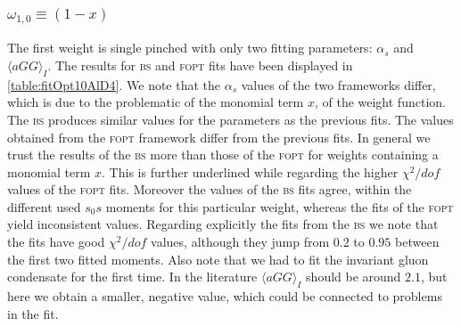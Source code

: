 \documentclass[../../index.tex]{subfiles}
\begin{document}
\subsubsection{\(\omega_{1,0} \equiv (1-x)\)}
The first weight is single pinched with only two fitting parameters:
\(\alpha_s\) and \(\langle aGG \rangle_I\). The results for \textsc{bs} and
\textsc{fopt} fits have been displayed in \cref{table:fitOpt10AlD4}. We note
that the \(\alpha_s\) values of the two frameworks differ, which is due to the
problematic of the monomial term \(x\), of the weight function. The
\textsc{bs} produces similar values for the parameters as the previous fits. The
values obtained from the \textsc{fopt} framework differ from the previous fits.
In general we trust the results of the \textsc{bs} more than those of the
\textsc{fopt} for weights containing a monomial term \(x\). This is further
underlined while regarding the higher \(\chi^2/dof\) values of the \textsc{fopt}
fits. Moreover the values of the \textsc{bs} fits agree, within the different
used \(s_0s\) moments for this particular weight, whereas the fits of the
\textsc{fopt} yield inconsistent values. Regarding explicitly the fits from the
\textsc{bs} we note that the fits have good \(\chi^2/dof\) values, although they 
jump from \(0.2\) to \(0.95\) between the first two fitted moments. Also note
that we had to fit the invariant gluon condensate for the first time. In the
literature \(\langle aGG \rangle_I\) should be around \(2.1\), but here we
obtain a smaller, negative value, which could be connected to problems in the
fit.
\end{document}
